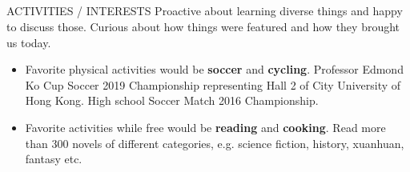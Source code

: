 \documentclass{my_cv}
\begin{document}
\begin{multicols}{2}
\section{\faSoccerBallO}{ACTIVITIES / INTERESTS}
Proactive about learning diverse things and happy to discuss those. Curious about how things were featured and how they brought us today. 
\begin{itemize}[noitemsep]
    \item Favorite physical activities would be \textbf{soccer} and \textbf{cycling}. Professor Edmond Ko Cup Soccer 2019 Championship representing Hall 2 of City University of Hong Kong. High school Soccer Match 2016 Championship.
    \item Favorite activities while free would be \textbf{reading} and \textbf{cooking}. Read more than 300 novels of different categories, e.g. science fiction, history, xuanhuan, fantasy etc.
\end{itemize}
\end{multicols}
\end{document}

